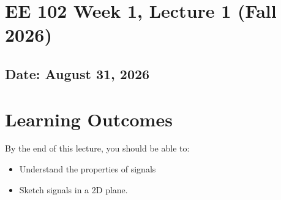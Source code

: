 \documentclass{ee102_notes}
\renewcommand{\releasedate}{August 31, 2026}
\begin{document}
\section*{EE 102 Week 1, Lecture 1 (Fall 2026)}
\subsection*{Date: \releasedate}
\section*{Learning Outcomes}
By the end of this lecture, you should be able to:
\begin{itemize}
  \item Understand the properties of signals
  \item Sketch signals in a 2D plane.
\end{itemize}
\tableofcontents
\newpage 

\end{document}
